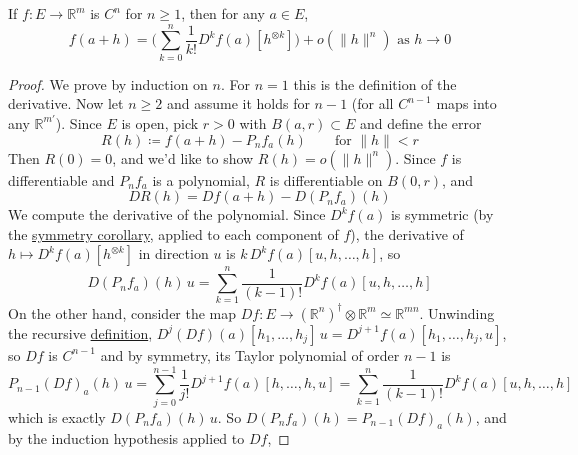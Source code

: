  \begin{theorem}
    \label{thm:multivariate-taylor-peano}
    If $f: E \to \mathbb{R}^m$ is $C^n$ for $n \geq 1$, then for any $a \in E$, 
    \begin{equation}
      f(a + h) = \bigg( \sum_{k=0}^n \frac{1}{k!} D^k f(a) [h^{\otimes k}] \bigg) + o(\|h\|^n) \text{ as } h \to 0
    \end{equation}
  \end{theorem}
  \begin{proof}
    We prove by induction on $n$. For $n = 1$ this is the definition of the derivative. Now let $n \geq 2$ and assume it holds for $n - 1$ (for all $C^{n-1}$ maps into any $\mathbb{R}^{m'}$). Since $E$ is open, pick $r > 0$ with $B(a, r) \subset E$ and define the error 
    \begin{equation}
      R(h) \coloneqq f(a + h) - P_n f_a (h) \qquad \text{for } \|h\| < r
    \end{equation}
    Then $R(0) = 0$, and we'd like to show $R(h) = o(\|h\|^n)$. Since $f$ is differentiable and $P_n f_a$ is a polynomial, $R$ is differentiable on $B(0, r)$, and 
    \begin{equation}
      DR(h) = Df(a + h) - D(P_n f_a)(h)
    \end{equation}
    We compute the derivative of the polynomial. Since $D^k f(a)$ is symmetric (by the \hyperref[thm:symmetry-in-kth-iterated-partials]{symmetry corollary}, applied to each component of $f$), the derivative of $h \mapsto D^k f(a) [h^{\otimes k}]$ in direction $u$ is $k \, D^k f(a) [u, h, \ldots, h]$, so 
    \begin{equation}
      D(P_n f_a)(h) \, u = \sum_{k=1}^n \frac{1}{(k-1)!} D^k f(a) [u, h, \ldots, h]
    \end{equation}
    On the other hand, consider the map $Df: E \to (\mathbb{R}^n)^\dagger \otimes \mathbb{R}^m \simeq \mathbb{R}^{mn}$. Unwinding the recursive \hyperref[def:kth-frechet-derivative]{definition}, $D^j (Df)(a) [h_1, \ldots, h_j] \, u = D^{j+1} f(a) [h_1, \ldots, h_j, u]$, so $Df$ is $C^{n-1}$ and by symmetry, its Taylor polynomial of order $n-1$ is 
    \begin{equation}
      P_{n-1} (Df)_a (h) \, u = \sum_{j=0}^{n-1} \frac{1}{j!} D^{j+1} f(a) [h, \ldots, h, u] = \sum_{k=1}^{n} \frac{1}{(k-1)!} D^k f(a) [u, h, \ldots, h] 
    \end{equation}
    which is exactly $D(P_n f_a)(h) \, u$. So $D(P_n f_a)(h) = P_{n-1}(Df)_a(h)$, and by the induction hypothesis applied to $Df$, 

\end{proof}
